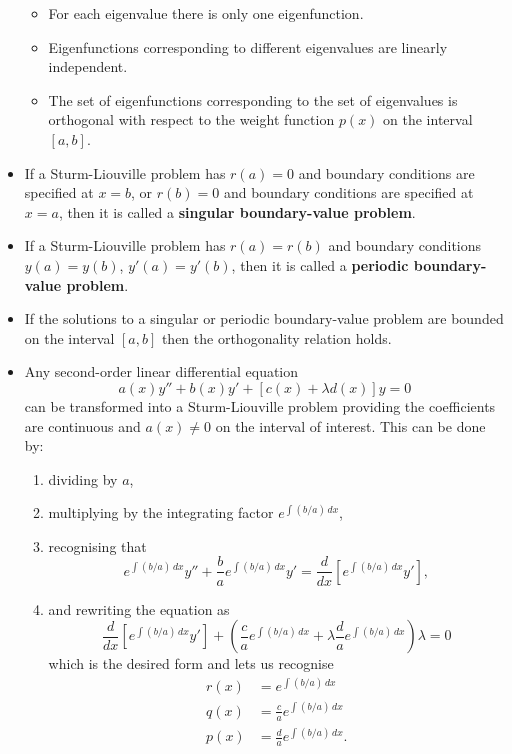 \documentclass{article}
\begin{document}
\begin{itemize}
\begin{itemize}
          \item For each eigenvalue there is only one eigenfunction.

          \item Eigenfunctions corresponding to different eigenvalues are linearly independent.

          \item The set of eigenfunctions corresponding to the set of eigenvalues is orthogonal with respect to the weight function $p(x)$ on the interval $[a, b]$.
        \end{itemize}

  \item If a Sturm-Liouville problem has $r(a) = 0$ and boundary conditions are specified at $x = b$, or $r(b) = 0$ and boundary conditions are specified at $x = a$, then it is called a \textbf{singular boundary-value problem}.

  \item If a Sturm-Liouville problem has $r(a) = r(b)$ and boundary conditions $y(a) = y(b)$, $y'(a) = y'(b)$, then it is called a \textbf{periodic boundary-value problem}.

  \item If the solutions to a singular or periodic boundary-value problem are bounded on the interval $[a, b]$ then the orthogonality relation holds.

  \item Any second-order linear differential equation \[a(x) y'' + b(x) y' + [c(x) + \lambda d(x)] y = 0\] can be transformed into a Sturm-Liouville problem providing the coefficients are continuous and $a(x) \ne 0$ on the interval of interest. This can be done by:

        \begin{enumerate}
          \item dividing by $a$,

          \item multiplying by the integrating factor $e^{\int (b / a) \,d x}$,

          \item recognising that \[e^{\int (b / a) \,d x} y'' + \frac{b}{a} e^{\int (b / a) \,d x} y' = \frac{d}{d x} \left[ e^{\int (b / a) \,d x} y' \right],\]

          \item and rewriting the equation as \[\frac{d}{d x} \left[ e^{\int (b / a) \,d x} y' \right] + \left( \frac{c}{a} e^{\int (b / a) \,d x} + \lambda \frac{d}{a} e^{\int (b / a) \,d x} \right) \lambda = 0\] which is the desired form and lets us recognise \begin{align*}
                  r(x) & = e^{\int (b / a) \,d x}              \\
                  q(x) & = \frac{c}{a} e^{\int (b / a) \,d x}  \\
                  p(x) & = \frac{d}{a} e^{\int (b / a) \,d x}.
                \end{align*}
        \end{enumerate}
\end{itemize}
\end{document}

